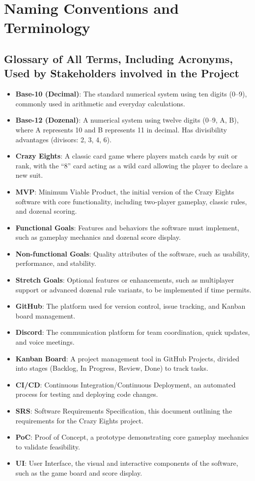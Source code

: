 \documentclass[12pt]{article}
\begin{document}
\section{Naming Conventions and Terminology}
\subsection{Glossary of All Terms, Including Acronyms, Used by Stakeholders
involved in the Project}

\begin{itemize}
    \item \textbf{Base-10 (Decimal)}: The standard numerical system using ten digits (0--9), commonly used in arithmetic and everyday calculations.
    \item \textbf{Base-12 (Dozenal)}: A numerical system using twelve digits (0--9, A, B), where A represents 10 and B represents 11 in decimal. Has divisibility advantages (divisors: 2, 3, 4, 6).
    \item \textbf{Crazy Eights}: A classic card game where players match cards by suit or rank, with the ``8'' card acting as a wild card allowing the player to declare a new suit.
    \item \textbf{MVP}: Minimum Viable Product, the initial version of the Crazy Eights software with core functionality, including two-player gameplay, classic rules, and dozenal scoring.
    \item \textbf{Functional Goals}: Features and behaviors the software must implement, such as gameplay mechanics and dozenal score display.
    \item \textbf{Non-functional Goals}: Quality attributes of the software, such as usability, performance, and stability.
    \item \textbf{Stretch Goals}: Optional features or enhancements, such as multiplayer support or advanced dozenal rule variants, to be implemented if time permits.
    \item \textbf{GitHub}: The platform used for version control, issue tracking, and Kanban board management.
    \item \textbf{Discord}: The communication platform for team coordination, quick updates, and voice meetings.
    \item \textbf{Kanban Board}: A project management tool in GitHub Projects, divided into stages (Backlog, In Progress, Review, Done) to track tasks.
    \item \textbf{CI/CD}: Continuous Integration/Continuous Deployment, an automated process for testing and deploying code changes.
    \item \textbf{SRS}: Software Requirements Specification, this document outlining the requirements for the Crazy Eights project.
    \item \textbf{PoC}: Proof of Concept, a prototype demonstrating core gameplay mechanics to validate feasibility.
    \item \textbf{UI}: User Interface, the visual and interactive components of the software, such as the game board and score display.
\end{itemize}
\end{document}
